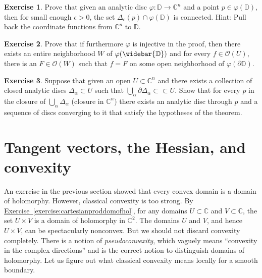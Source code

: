 \documentclass[12pt,openany]{book}
\newcommand{\C}{{\mathbb{C}}}
\newcommand{\D}{{\mathbb{D}}}
\newcommand{\sO}{{\mathscr{O}}}
\theoremstyle{plain}
\theoremstyle{remark}
\theoremstyle{definition}
\newenvironment{exbox}{%
    \def\FrameCommand{\vrule width 1pt \relax\hspace{10pt}}%
    \MakeFramed{\advance\hsize-\width\FrameRestore}%
}{%
    \endMakeFramed
}
\theoremstyle{exercise}
\newtheorem{exercise}{Exercise}[section]
\theoremstyle{example}
\newcommand{\exerciseref}[1]{\hyperref[#1]{Exercise~\ref*{#1}}}
\begin{document}
\begin{exbox}
\begin{exercise}
Prove that given an analytic disc $\varphi \colon \D \to \C^n$ and a point
$p \in \varphi(\D)$, then for small enough $\epsilon > 0$, the set
$\Delta_\epsilon(p) \cap \varphi(\D)$ is connected.  Hint: Pull back the
coordinate functions from $\C^n$ to $\D$.
\end{exercise}

\begin{exercise}
Prove that if furthermore $\varphi$ is injective in the proof,
then there exists an entire neighborhood $W$ of $\varphi(\widebar{\D})$
and for every $f \in \sO(U)$, there is an $F \in \sO(W)$ such that
$f=F$ on some open neighborhood of $\varphi(\partial \D)$.
\end{exercise}

\begin{exercise}
Suppose that given an open $U \subset \C^n$
and there exists a collection of
closed analytic discs $\Delta_\alpha \subset U$
such that $\bigcup_\alpha \partial \Delta_\alpha \subset \subset U$.
Show that for every $p$ in the closure of $\bigcup_\alpha \Delta_\alpha$
(closure in $\C^n$) there exists an analytic disc through $p$ and a sequence
of discs converging to it that satisfy the hypotheses of the theorem.
\end{exercise}
\end{exbox}


\section{Tangent vectors, the Hessian, and convexity}

An exercise in the previous section showed that every convex domain is a
domain of holomorphy.  However, classical convexity is too strong.
By \exerciseref{exercise:cartesianproddomofhol},
for any domains $U \subset \C$ and $V \subset \C$, the set
$U \times V$ is a domain of holomorphy in $\C^2$.  The domains
$U$ and $V$, and hence $U \times V$, can be spectacularly nonconvex.
But we should not discard convexity completely.
There is a notion of
\emph{pseudoconvexity}, which vaguely means ``convexity in the
complex directions'' and is the correct notion to distinguish
domains of holomorphy.
Let us figure out what classical convexity means locally for a smooth boundary.
\end{document}
